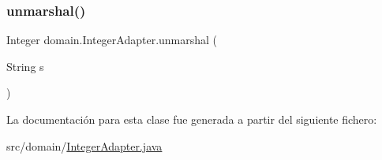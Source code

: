 \subsubsection{\texorpdfstring{unmarshal()}{unmarshal()}}
{\footnotesize\ttfamily Integer domain.\+Integer\+Adapter.\+unmarshal (\begin{DoxyParamCaption}\item[{String}]{s }\end{DoxyParamCaption})}



La documentación para esta clase fue generada a partir del siguiente fichero\+:\begin{DoxyCompactItemize}
\item 
src/domain/\mbox{\hyperlink{_integer_adapter_8java}{Integer\+Adapter.\+java}}\end{DoxyCompactItemize}
